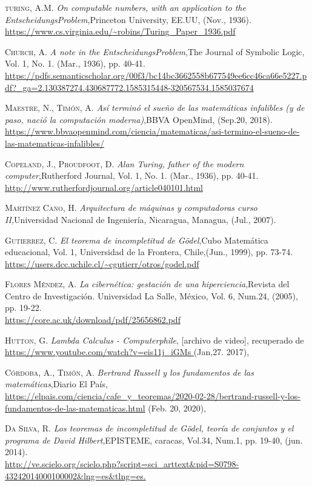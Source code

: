 \documentclass[12pt]{article}
\begin{document}
\begin{thebibliography}{x}

 \textsc{turing, A.M.}
\textit{On computable numbers, with an application to the EntscheidungsProblem},Princeton University, EE.UU, (Nov., 1936). \\\url{https://www.cs.virginia.edu/~robins/Turing_Paper_1936.pdf}

 \textsc{Church, A.}
\textit{A note in the EntscheidungsProblem},The Journal of Symbolic Logic, Vol. 1, No. 1. (Mar., 1936), pp. 40-41. \\\url{https://pdfs.semanticscholar.org/00f3/bc14bc3662558b677549ee6cc46ca66e5227.pdf?_ga=2.130387274.430687772.1585315448-320567534.1585037674}

 \textsc{Maestre, N., Timón, A.}
\textit{Así terminó el sueño de las matemáticas infalibles (y de paso, nació la computación moderna)},BBVA OpenMind, (Sep.20, 2018). \\\url{https://www.bbvaopenmind.com/ciencia/matematicas/asi-termino-el-sueno-de-las-matematicas-infalibles/}

 \textsc{Copeland, J., Proudfoot, D.}
\textit{Alan Turing, father of the modern computer},Rutherford Journal, Vol. 1, No. 1. (Mar., 1936), pp. 40-41. \\\url{http://www.rutherfordjournal.org/article040101.html}

 \textsc{Martínez Cano, H.}
\textit{Arquitectura de máquinas y computadoras curso II,}Universidad Nacional de Ingeniería, Nicaragua, Managua, (Jul., 2007).

 \textsc{Gutierrez, C.}
\textit{El teorema de incompletitud de Gödel},Cubo Matemática educacional, Vol. 1, Universidad de la Frontera, Chile,(Jun., 1999), pp. 73-74. \\\url{https://users.dcc.uchile.cl/~cgutierr/otros/godel.pdf}

 \textsc{Flores Méndez, A.}
\textit{La cibernética: gestación de una hiperciencia},Revista del Centro de Investigación. Universidad La Salle, México, Vol. 6, Num.24, (2005), pp. 19-22. \\\url{https://core.ac.uk/download/pdf/25656862.pdf}

 \textsc{Hutton, G.}
\textit{Lambda Calculus - Computerphile}, [archivo de video], recuperado de \url{https://www.youtube.com/watch?v=eis11j_iGMs } (Jan,27. 2017),

 \textsc{Córdoba, A., Timón, A.}
\textit{Bertrand Russell y los fundamentos de las matemáticas},Diario El País, \\\url{https://elpais.com/ciencia/cafe_y_teoremas/2020-02-28/bertrand-russell-y-los-fundamentos-de-las-matematicas.html} (Feb. 20, 2020),

 \textsc{Da Silva, R.}
\textit{Los teoremas de incompletitud de Gödel, teoría de conjuntos y el programa de David Hilbert},EPISTEME, caracas, Vol.34, Num.1, pp. 19-40, (jun. 2014). \\\url{http://ve.scielo.org/scielo.php?script=sci_arttext&pid=S0798-43242014000100002&lng=es&tlng=es.}

\end{thebibliography}
\end{document}
